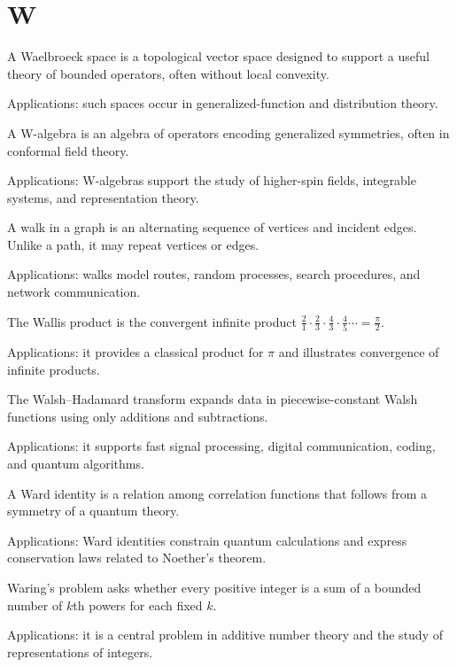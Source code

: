 \chapter*{W}
\label{chap:w}

A Waelbroeck space is a topological vector space designed to support a useful theory of bounded operators, often without local convexity. \par\noindent Applications: such spaces occur in generalized-function and distribution theory.

A W-algebra is an algebra of operators encoding generalized symmetries, often in conformal field theory. \par\noindent Applications: W-algebras support the study of higher-spin fields, integrable systems, and representation theory.

A walk in a graph is an alternating sequence of vertices and incident edges. Unlike a path, it may repeat vertices or edges. \par\noindent Applications: walks model routes, random processes, search procedures, and network communication.

The Wallis product is the convergent infinite product $\frac21\cdot\frac23\cdot\frac43\cdot\frac45\cdots=\frac\pi2$. \par\noindent Applications: it provides a classical product for $\pi$ and illustrates convergence of infinite products.

The Walsh--Hadamard transform expands data in piecewise-constant Walsh functions using only additions and subtractions. \par\noindent Applications: it supports fast signal processing, digital communication, coding, and quantum algorithms.

A Ward identity is a relation among correlation functions that follows from a symmetry of a quantum theory. \par\noindent Applications: Ward identities constrain quantum calculations and express conservation laws related to Noether's theorem.

Waring's problem asks whether every positive integer is a sum of a bounded number of $k$th powers for each fixed $k$. \par\noindent Applications: it is a central problem in additive number theory and the study of representations of integers.

